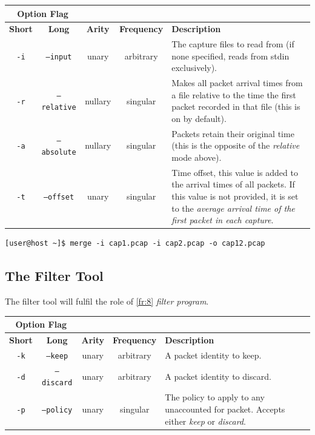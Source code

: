 \documentclass[10pt,a4paper,notitlepage,twoside]{report}
\begin{document}
\begin{tabularx}{\textwidth}{|c|c|c|c|X|}
\cline{1-2}
\multicolumn{2}{|c|}{\textbf{Option Flag}} & \multicolumn{3}{c}{}\\ \hline
\textbf{Short} & \textbf{Long} & \textbf{Arity} & \textbf{Frequency} & \textbf{Description} \\ \hline
\texttt{-i} & \texttt{--input} & unary & arbitrary & The capture files to read from (if none specified, reads from stdin exclusively).\\ \hline
\texttt{-r} & \texttt{--relative} & nullary & singular & Makes all packet arrival times from a file relative to the time the first packet recorded in that file (this is on by default).\\ \hline
\texttt{-a} & \texttt{--absolute} & nullary & singular & Packets retain their original time (this is the opposite of the \emph{relative} mode above).\\ \hline
\texttt{-t} & \texttt{--offset} & unary & singular & Time offset, this value is added to the arrival times of all packets. If this value is not provided, it is set to the \emph{average arrival time of the first packet in each capture}. \\ \hline
\end{tabularx}

\begin{verbatim}
[user@host ~]$ merge -i cap1.pcap -i cap2.pcap -o cap12.pcap
\end{verbatim}
\subsection{The Filter Tool}
The filter tool will fulfil the role of \ref{fr:8} \emph{filter program}.

\begin{tabularx}{\textwidth}{|c|c|c|c|X|}
\cline{1-2}
\multicolumn{2}{|c|}{\textbf{Option Flag}} & \multicolumn{3}{c}{}\\ \hline
\textbf{Short} & \textbf{Long} & \textbf{Arity} & \textbf{Frequency} & \textbf{Description} \\ \hline
\texttt{-k} & \texttt{--keep} & unary & arbitrary & A packet identity to keep.\\ \hline
\texttt{-d} & \texttt{--discard} & unary & arbitrary & A packet identity to discard.\\ \hline
\texttt{-p} & \texttt{--policy} & unary & singular & The policy to apply to any unaccounted for packet. Accepts either \emph{keep} or \emph{discard}.\\ \hline
\end{tabularx}
\end{document}
